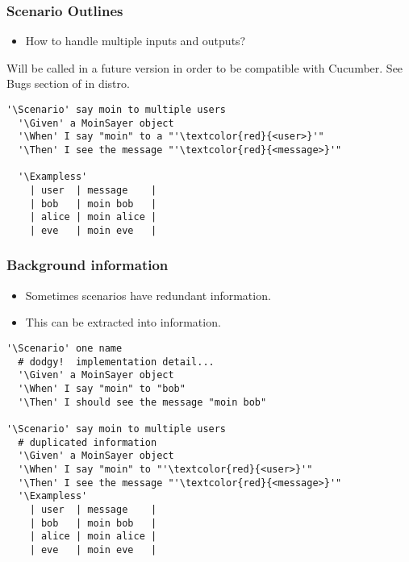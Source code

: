\documentclass[10pt]{vcs_beamer}
\newcommand{\Background}{\color{BlueViolet}{Background:}}
\newcommand{\Scenario}{\color{BlueViolet}{Scenario:}}
\newcommand{\ScenarioOutline}{\color{BlueViolet}{Scenario Outline:}}
\newcommand{\Exampless}{\color{BlueViolet}{Examples:}}
\newcommand{\Given}{\color{DarkOrange}{Given}}
\newcommand{\When}{\color{RoyalBlue}{When}}
\newcommand{\Then}{\color{ForestGreen}{Then}}
\begin{document}
\begin{frame}[fragile]
\frametitle{Scenario Outlines}

\begin{itemize}
    \item How to handle multiple inputs and outputs?
\end{itemize}

Will be called \ttt{\ScenarioOutline} in a future version in order to be
compatible with Cucumber.  See Bugs section of  in distro.

\begin{lstlisting}[escapeinside='']
'\Scenario' say moin to multiple users
  '\Given' a MoinSayer object
  '\When' I say "moin" to a "'\textcolor{red}{<user>}'"
  '\Then' I see the message "'\textcolor{red}{<message>}'"

  '\Exampless'
    | user  | message    |
    | bob   | moin bob   |
    | alice | moin alice |
    | eve   | moin eve   |
\end{lstlisting}

\end{frame}

\begin{frame}[fragile]
\frametitle{Background information}

\begin{itemize}
    \item Sometimes scenarios have redundant information.
    \item This can be extracted into \ttt{\Background} information.
\end{itemize}

\begin{lstlisting}[escapeinside='']
'\Scenario' one name
  # dodgy!  implementation detail...
  '\Given' a MoinSayer object
  '\When' I say "moin" to "bob"
  '\Then' I should see the message "moin bob"

'\Scenario' say moin to multiple users
  # duplicated information
  '\Given' a MoinSayer object
  '\When' I say "moin" to "'\textcolor{red}{<user>}'"
  '\Then' I see the message "'\textcolor{red}{<message>}'"
  '\Exampless'
    | user  | message    |
    | bob   | moin bob   |
    | alice | moin alice |
    | eve   | moin eve   |
\end{lstlisting}

\end{frame}
\end{document}
